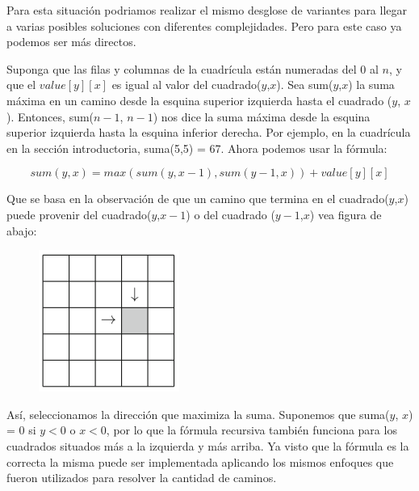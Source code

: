 Para esta situación podriamos realizar el mismo desglose de variantes para llegar a varias posibles soluciones con diferentes complejidades. Pero para este caso ya podemos ser más directos. 

Suponga que las filas y columnas de la cuadrícula están numeradas del $0$ al $n$, y que el $value[y][x]$ es igual al valor del cuadrado($y$,$x$). Sea sum($y$,$x$) la suma máxima en un camino desde la esquina superior izquierda hasta el cuadrado ($y$, $x$). Entonces, sum($n-1$, $n-1$) nos dice la suma máxima desde la esquina superior izquierda hasta la esquina inferior derecha. Por ejemplo, en la cuadrícula en la sección introductoria, suma(5,5) = 67. Ahora podemos usar la fórmula:

$$sum(y,x) = max(sum(y,x-1),sum(y-1,x))+value[y][x]$$

Que se basa en la observación de que un camino que termina en el cuadrado($y$,$x$) puede provenir del cuadrado($y$,$x-1$) o del cuadrado ($y-1$,$x$) vea figura de abajo:

\begin{figure}[h!]
	\centering
	\includegraphics[width=0.3\linewidth]{img/grid_path_ii}
	\label{fig:gridpathii}
\end{figure} 

Así, seleccionamos la dirección que maximiza la suma. Suponemos que suma($y$, $x$) = $0$ si $y < 0 $ o $x < 0$, por lo que la fórmula recursiva también funciona para los cuadrados situados más a la izquierda y más arriba. Ya visto que la fórmula es la correcta la misma puede ser implementada aplicando los mismos enfoques que fueron utilizados para resolver la cantidad de caminos. 

